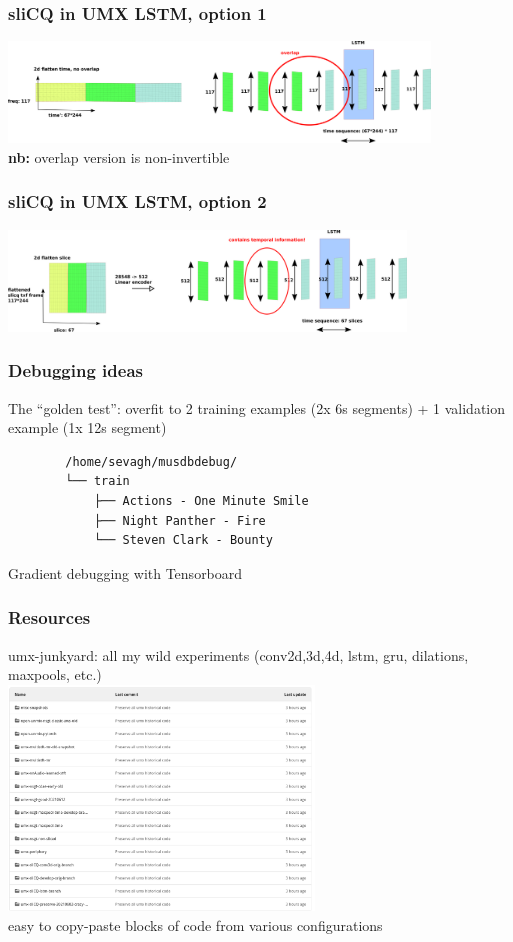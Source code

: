 \documentclass[usenames,dvipsnames]{beamer}
\begin{document}
\begin{frame}
	\frametitle{sliCQ in UMX LSTM, option 1}
	\includegraphics[height=2.7cm]{./umxslicqlstm1.png}\\
	\textbf{nb:} overlap version is non-invertible
\end{frame}

\begin{frame}
	\frametitle{sliCQ in UMX LSTM, option 2}
	\includegraphics[height=2.7cm]{./umxslicqlstm2.png}
\end{frame}

\begin{frame}[fragile]
	\frametitle{Debugging ideas}
	The ``golden test'': overfit to 2 training examples (2x 6s segments) + 1 validation example (1x 12s segment)
	\begin{verbatim}
        /home/sevagh/musdbdebug/
        └── train
            ├── Actions - One Minute Smile
            ├── Night Panther - Fire
            └── Steven Clark - Bounty
	\end{verbatim}
	Gradient debugging with Tensorboard
\end{frame}

\begin{frame}
	\frametitle{Resources}
	umx-junkyard: all my wild experiments (conv2d,3d,4d, lstm, gru, dilations, maxpools, etc.)\\
	\includegraphics[height=6cm]{./junkyard.png}\\
	easy to copy-paste blocks of code from various configurations
\end{frame}
\end{document}
